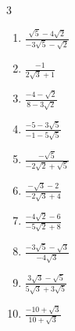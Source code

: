 \begin{multicols}{3}
\begin{enumerate}

\columnbreak %

\resetques

  \item $\displaystyle \frac{\sqrt{5}-4\sqrt{2}}{-3\sqrt{5}-\sqrt{2}}$


  \item $\displaystyle \frac{-1}{2\sqrt{3}+1}$


  \item $\displaystyle \frac{-4-\sqrt{2}}{8-3\sqrt{2}}$


  \item $\displaystyle \frac{-5-3\sqrt{5}}{-1-5\sqrt{5}}$


  \item $\displaystyle \frac{-\sqrt{5}}{-2\sqrt{2}+\sqrt{5}}$


\columnbreak %

  \item $\displaystyle \frac{-\sqrt{3}-2}{-2\sqrt{3}+4}$


  \item $\displaystyle \frac{-4\sqrt{2}-6}{-5\sqrt{2}+8}$


  \item $\displaystyle \frac{-3\sqrt{5}-\sqrt{3}}{-4\sqrt{3}}$


  \item $\displaystyle \frac{3\sqrt{3}-\sqrt{5}}{5\sqrt{3}+3\sqrt{5}}$


  \item $\displaystyle \frac{-10+\sqrt{3}}{10+\sqrt{3}}$



\end{enumerate}
\end{multicols}
